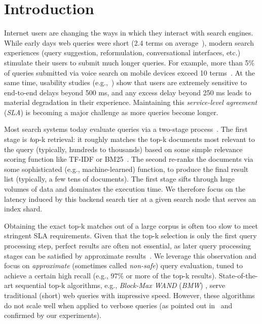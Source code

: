 \section{Introduction}
\label{sec:intro}

Internet users are changing the ways in which they interact with search engines. 
While  early days web queries were short (2.4 terms on average~\cite{Spink:2001:SWP:362968.362979}), 
modern search experiences (query suggestion, reformulation, conversational interfaces, etc.) stimulate their users to submit much longer queries. 
For example, more than 5\% of queries submitted via voice search on mobile devices exceed 10 terms~\cite{sigir/Guy16}. 
At the same time, usability studies
(e.g.,~\cite{Arapakis:2014:IRL:2600428.2609627}) show that users are extremely sensitive to end-to-end delays beyond 500 ms, 
and any excess delay beyond 250 ms leads to material degradation in their experience. Maintaining this \emph{service-level agreement} ({\em SLA}) 
is becoming a major challenge as more queries become longer.

 Most search systems today evaluate queries via a two-stage process~\cite{Wang:2011}. 
The first stage is {\emph top-k retrieval}: it 
 roughly matches the top-k documents most relevant to the query (typically, hundreds to thousands) based on some simple relevance scoring function like TF-IDF or BM25~\cite{Baeza-Yates:1999:MIR:553876}. The second  re-ranks the  documents via some sophisticated (e.g., machine-learned) function, to produce the final result list (typically, a few tens of documents). 
The first stage  sifts through huge volumes of data and dominates the execution time. 
We therefore focus on the latency induced by this backend search tier at a given search node that serves an index shard.

Obtaining the exact top-k matches out of a large corpus is often too slow to meet stringent SLA requirements. 
Given that the top-k selection is only the first query  processing step, perfect results are often not essential, as later query processing 
stages can be satisfied by approximate results~\cite{Lin:2015}. We leverage this observation and focus on \emph{approximate} 
(sometimes called \emph{non-safe}) query evaluation, tuned to achieve a certain high recall (e.g., $97\%$ or more of the top-k results). 
State-of-the-art sequential top-k  algorithms, 
e.g., \emph{Block-Max WAND} ({\em BMW}) \cite{Ding:2011}, serve traditional (short) web queries with impressive speed. 
However, these algorithms do not scale well when applied to verbose queries (as pointed out in~\cite{Bortnikov:2017} and confirmed by our experiments). 

